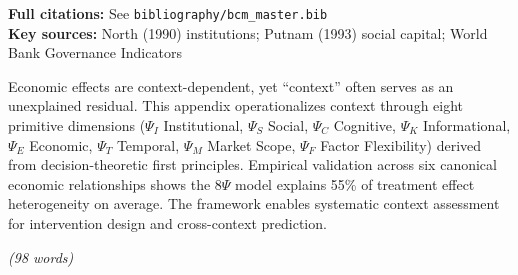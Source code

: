 \noindent\textbf{Full citations:} See \texttt{bibliography/bcm\_master.bib} \\
\textbf{Key sources:} North (1990) institutions; Putnam (1993) social capital; World Bank Governance Indicators

\vspace{1em}


\begin{tcolorbox}[colback=white, colframe=black,
    title=\textbf{Abstract}]

Economic effects are context-dependent, yet ``context'' often serves as an 
unexplained residual. This appendix operationalizes context through eight 
primitive dimensions ($\Psi_I$ Institutional, $\Psi_S$ Social, $\Psi_C$ Cognitive, 
$\Psi_K$ Informational, $\Psi_E$ Economic, $\Psi_T$ Temporal, $\Psi_M$ Market Scope, 
$\Psi_F$ Factor Flexibility) derived from decision-theoretic first principles. 
Empirical validation across six canonical economic relationships shows the 
8$\Psi$ model explains 55\% of treatment effect heterogeneity on average. 
The framework enables systematic context assessment for intervention design 
and cross-context prediction.

\textit{(98 words)}

\end{tcolorbox}


